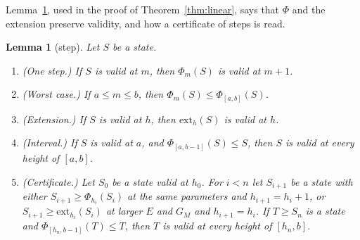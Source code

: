 \documentclass[11pt]{amsart}
\newtheorem{lemma}[theorem]{Lemma}
\theoremstyle{definition}
\numberwithin{equation}{section}
\newcommand{\lean}[1]{\ignorespaces}
\begin{document}
Lemma~\ref{lem:step}, used in the proof of Theorem~\ref{thm:linear}, says that $\Phi$ and the extension preserve validity, and how a certificate of steps is read.

\begin{lemma}[step]\label{lem:step}\lean{FrogModel.D3.Assembly.lemma18_1_proof, FrogModel.D3.LaneC.lemma18_3_proof, FrogModel.D3.Assembly.ext_valid_proof, FrogModel.D3.Iface.lemma18_1, FrogModel.D3.Iface.lemma18_3, FrogModel.D3.Iface.ext_valid, FrogModel.D3.Iface.lemma18_4_of, FrogModel.D3.Iface.lemma18_6_of, FrogModel.D3.Iface.CertStep}
Let $S$ be a state.
\begin{enumerate}
\item (One step.) If $S$ is valid at $m$, then $\Phi_m(S)$ is valid at $m+1$.
\item (Worst case.) If $a\le m\le b$, then $\Phi_m(S)\le\Phi_{[a,b]}(S)$.
\item (Extension.) If $S$ is valid at $h$, then $\mathrm{ext}_h(S)$ is valid at $h$.
\item (Interval.) If $S$ is valid at $a$, and $\Phi_{[a,b-1]}(S)\le S$, then $S$ is valid at every height of $[a,b]$.
\item (Certificate.) Let $S_0$ be a state valid at $h_0$. For $i<n$ let $S_{i+1}$ be a state with either $S_{i+1}\ge\Phi_{h_i}(S_i)$ at the same parameters and $h_{i+1}=h_i+1$, or $S_{i+1}\ge\mathrm{ext}_{h_i}(S_i)$ at larger $E$ and $G_M$ and $h_{i+1}=h_i$. If $T\ge S_n$ is a state and $\Phi_{[h_n,b-1]}(T)\le T$, then $T$ is valid at every height of $[h_n,b]$.
\end{enumerate}
\end{lemma}
\end{document}
